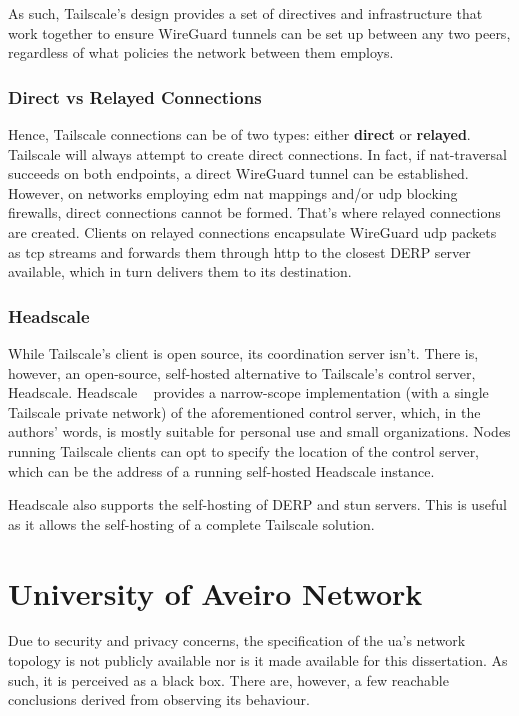 \documentclass[11pt,twoside,a4paper]{report}
\begin{document}
As such, Tailscale's design provides a set of directives and infrastructure that work together to ensure WireGuard tunnels can be set up between any two peers, regardless of what policies the network between them employs.

\subsubsection{Direct vs Relayed Connections}

Hence, Tailscale connections can be of two types: either \textbf{direct} or \textbf{relayed}. Tailscale will always attempt to create direct connections. In fact, if \ac{nat}-traversal succeeds on both endpoints, a direct WireGuard tunnel can be established. However, on networks employing \ac{edm} \ac{nat} mappings and/or \ac{udp} blocking firewalls, direct connections cannot be formed. That's where relayed connections are created. Clients on relayed connections encapsulate WireGuard \ac{udp} packets as \ac{tcp} streams and forwards them through \ac{http} to the closest \ac{DERP} server available, which in turn delivers them to its destination.

\subsubsection{Headscale}
\label{sec:hs}

While Tailscale's client is open source, its coordination server isn't. There is, however, an open-source, self-hosted alternative to Tailscale's control server, Headscale. Headscale ~\cite{headscale2023online} provides a narrow-scope implementation (with a single Tailscale private network) of the aforementioned control server, which, in the authors' words, is mostly suitable for personal use and small organizations. Nodes running Tailscale clients can opt to specify the location of the control server, which can be the address of a running self-hosted Headscale instance.

Headscale also supports the self-hosting of \ac{DERP} and \ac{stun} servers. This is useful as it allows the self-hosting of a complete Tailscale solution.

\section{University of Aveiro Network}
\label{sec:uanet}

Due to security and privacy concerns, the specification of the \ac{ua}'s network topology is not publicly available nor is it made available for this dissertation. As such, it is perceived as a black box. There are, however, a few reachable conclusions derived from observing its behaviour.
\end{document}
